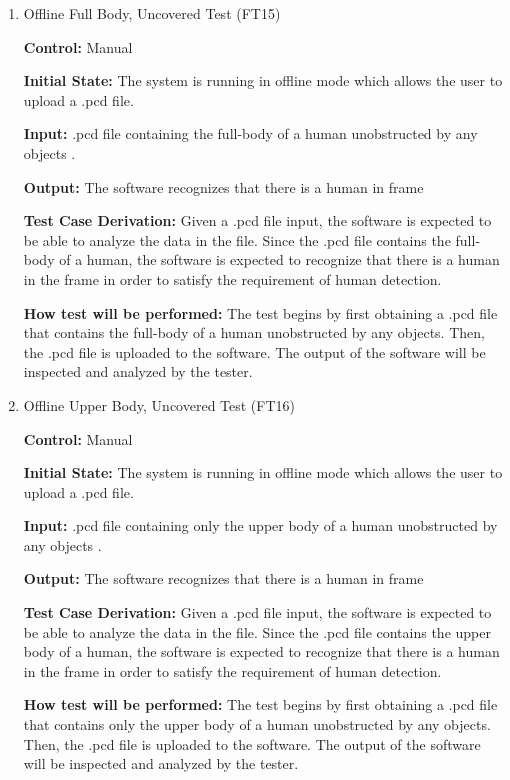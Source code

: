 \documentclass[12pt, titlepage]{article}
\begin{document}
\begin{enumerate}
  
\item{Offline Full Body, Uncovered Test (FT15)\\}

\textbf{Control:} Manual

\textbf{Initial State:} The system is running in offline mode which allows the user to upload a .pcd file.

\textbf{Input:} .pcd file containing the full-body of a human unobstructed by any objects .

\textbf{Output:} The software recognizes that there is a human in frame

\textbf{Test Case Derivation:} Given a .pcd file input, the software is expected to be able to analyze the data in the file. Since the .pcd file contains the full-body of a human, the software is expected to recognize that there is a human in the frame in order to satisfy the requirement of human detection.

\textbf{How test will be performed:} The test begins by first obtaining a .pcd file that contains the full-body of a human unobstructed by any objects. Then, the .pcd file is uploaded to the software. The output of the software will be inspected and analyzed by the tester.

\item{Offline Upper Body, Uncovered Test (FT16)\\}

\textbf{Control:} Manual

\textbf{Initial State:} The system is running in offline mode which allows the user to upload a .pcd file.

\textbf{Input:} .pcd file containing only the upper body of a human unobstructed by any objects .

\textbf{Output:} The software recognizes that there is a human in frame

\textbf{Test Case Derivation:} Given a .pcd file input, the software is expected to be able to analyze the data in the file. Since the .pcd file contains the upper body of a human, the software is expected to recognize that there is a human in the frame in order to satisfy the requirement of human detection.

\textbf{How test will be performed:} The test begins by first obtaining a .pcd file that contains only the upper body of a human unobstructed by any objects. Then, the .pcd file is uploaded to the software. The output of the software will be inspected and analyzed by the tester.


\end{enumerate}
\end{document}
